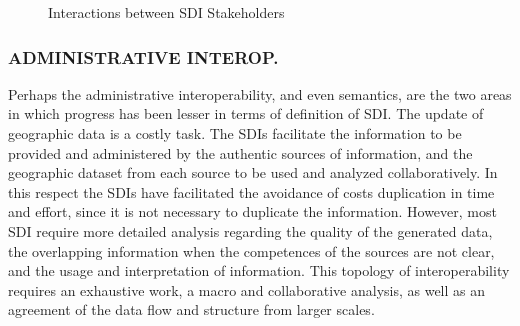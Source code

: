 \documentclass[10pt,twocolumn,ieeetran]{article}
\begin{document}
\begin{figure}[h]
\begin{center}
\caption{Interactions between SDI Stakeholders}
\label{fig5}
\end{center}
\end{figure}


\subsubsection{ADMINISTRATIVE INTEROP.}
Perhaps the administrative interoperability, and even semantics, are the two areas in which progress has been lesser in terms of definition of SDI. The update of geographic data is a costly task. The SDIs facilitate the information to be provided and administered by the authentic sources of information, and  the geographic dataset from each source to be used and analyzed collaboratively. In this respect  the SDIs have facilitated the avoidance of costs  duplication  in time and effort, since it is not necessary  to duplicate  the information.
However, most SDI require more detailed analysis regarding the quality of the generated data, the overlapping  information when the competences of the sources are not clear, and the usage and interpretation of information. This topology of interoperability requires an exhaustive work,  a macro and collaborative analysis, as well as an agreement of the data flow and structure from larger scales.
\end{document}
